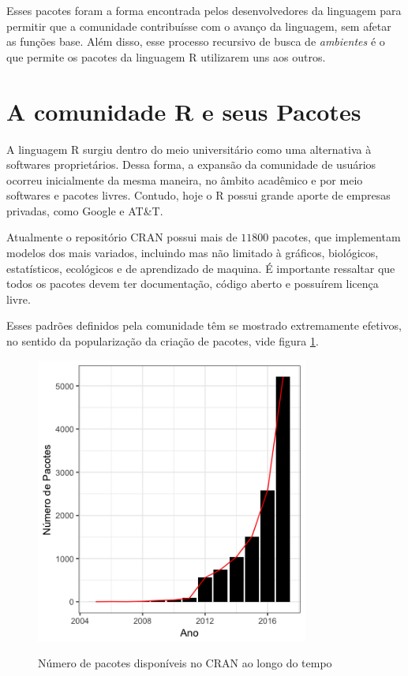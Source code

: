  Esses pacotes foram a forma encontrada pelos desenvolvedores da linguagem para permitir que a comunidade contribuísse com o avanço da linguagem, sem afetar as funções base. Além disso, esse processo recursivo de busca de \textit{ambientes} é o que permite os pacotes da linguagem R utilizarem uns aos outros.

\section{A comunidade R e seus Pacotes}
A linguagem R surgiu dentro do meio universitário como uma alternativa à softwares proprietários. Dessa forma, a expansão da comunidade de usuários ocorreu inicialmente da mesma maneira, no âmbito acadêmico e por meio softwares e pacotes livres. Contudo, hoje o R possui grande aporte de empresas privadas, como Google e AT\&T. 

Atualmente o repositório CRAN possui mais de $11800$ pacotes, que implementam modelos dos mais variados, incluindo mas não limitado à gráficos, biológicos, estatísticos, ecológicos e de aprendizado de maquina. É importante ressaltar que todos os pacotes devem ter documentação, código aberto e possuírem licença livre. 

Esses padrões definidos pela comunidade têm se mostrado extremamente efetivos, no sentido da popularização da criação de pacotes, vide figura \ref{fig:RNPackages}.

\begin{figure}[!htb]
	\centering
	\caption{Número de pacotes disponíveis no CRAN ao longo do tempo} 
	\includegraphics[width=0.8\textwidth]{./04-figuras/NRPackages}
	\label{fig:RNPackages}
\end{figure}


